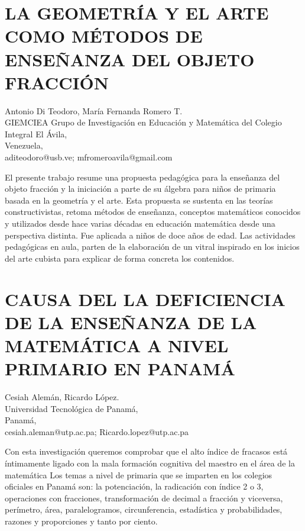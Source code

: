 \section{LA GEOMETRÍA Y EL ARTE COMO MÉTODOS DE ENSEÑANZA DEL OBJETO FRACCIÓN}

\begin{datos}
Antonio Di Teodoro, María Fernanda Romero T.\\
GIEMCIEA Grupo de Investigación en Educación y Matemática del Colegio Integral El Ávila,\\
Venezuela,\\
\hfill  aditeodoro@usb.ve; mfromeroavila@gmail.com
\end{datos}

El presente trabajo resume una propuesta pedagógica para la enseñanza
del objeto fracción y la iniciación a parte de su álgebra para niños
de primaria basada en la geometría y el arte. Esta propuesta se sustenta
en las teorías constructivistas, retoma métodos de enseñanza, conceptos
matemáticos conocidos y utilizados desde hace varias décadas en educación
matemática desde una perspectiva distinta. Fue aplicada a niños de
doce años de edad. Las actividades pedagógicas en aula, parten de
la elaboración de un vitral inspirado en los inicios del arte cubista
para explicar de forma concreta los contenidos. 


\section{\uppercase{ Causa del la deficiencia de la enseñanza de la Matemática
a Nivel Primario en Panamá}}

\begin{datos}
Cesiah Alemán, Ricardo López.\\
Universidad Tecnológica de Panamá,\\
Panamá,\\
\hfill  cesiah.aleman@utp.ac.pa; Ricardo.lopez@utp.ac.pa 
\end{datos}

Con esta investigación queremos comprobar que el alto índice de fracasos
está íntimamente ligado con la mala formación cognitiva del maestro
en el área de la matemática Los temas a nivel de primaria que se imparten
en los colegios oficiales en Panamá son: la potenciación, la radicación
con índice 2 o 3, operaciones con fracciones, transformación de decimal
a fracción y viceversa, perímetro, área, paralelogramos, circunferencia,
estadística y probabilidades, razones y proporciones y tanto por ciento.



